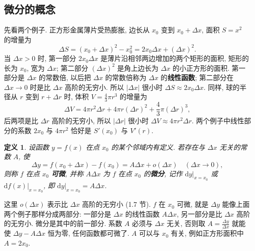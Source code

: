 \documentclass[UTF8,openany]{ctexbook}
\theoremstyle{chinesetextbook}
\newtheorem*{definitionsingle}{定义}
\newcommand{\dd}{\mathrm d}
\begin{document}
\subsection{微分的概念}
先看两个例子. 正方形金属薄片受热膨胀, 边长从 $x_0$ 变到 $x_0+\Delta x$, 面积 $S=x^2$ 的增量为
\[
\Delta S=(x_0+\Delta x)^2-x_0^2=2x_0\Delta x+(\Delta x)^2.
\]
当 $\Delta x>0$ 时, 第一部分 $2x_0\Delta x$ 是薄片沿相邻两边增加的两个矩形的面积, 矩形的长为 $x_0$, 宽为 $\Delta x$; 第二部分 $(\Delta x)^2$ 是角上边长为 $\Delta x$ 的小正方形的面积. 第一部分是 $\Delta x$ 的常数倍, 以后把 $\Delta x$ 的常数倍称为 $\Delta x$ 的\textbf{线性函数}; 第二部分在 $\Delta x\to0$ 时是比 $\Delta x$ 高阶的无穷小. 所以 $|\Delta x|$ 很小时 $\Delta S\approx2x_0\Delta x$. 同样, 球的半径从 $r$ 变到 $r+\Delta r$ 时, 体积 $\displaystyle V=\frac43\pi r^3$ 的增量为
\[
\Delta V=4\pi r^2\Delta r+4\pi r(\Delta r)^2+\frac43\pi(\Delta r)^3,
\]
后两项是比 $\Delta r$ 高阶的无穷小, 所以 $|\Delta r|$ 很小时 $\Delta V\approx4\pi r^2\Delta r$. 两个例子中线性部分的系数 $2x_0$ 与 $4\pi r^2$ 恰好是 $S'(x_0)$ 与 $V'(r)$.
\begin{definitionsingle}
设函数 $y=f(x)$ 在点 $x_0$ 的某个邻域内有定义. 若存在与 $\Delta x$ 无关的常数 $A$, 使
\[
\Delta y=f(x_0+\Delta x)-f(x_0)=A\Delta x+o(\Delta x)\quad(\Delta x\to0),
\]
则称 $f$ 在点 $x_0$ \textbf{可微}, 并称 $A\Delta x$ 为 $f$ 在点 $x_0$ 的\textbf{微分}, 记作 $\dd y\big|_{x=x_0}$ 或 $\dd f(x)\big|_{x=x_0}$, 即 $\dd y\big|_{x=x_0}=A\Delta x$.
\end{definitionsingle}
这里 $o(\Delta x)$ 表示比 $\Delta x$ 高阶的无穷小 (1.7 节). $f$ 在 $x_0$ 可微, 就是 $\Delta y$ 能像上面两个例子那样分成两部分: 一部分是 $\Delta x$ 的线性函数 $A\Delta x$, 另一部分是比 $\Delta x$ 高阶的无穷小. 微分是其中的前一部分. 系数 $A$ 必须与 $\Delta x$ 无关, 否则取 $\displaystyle A=\frac{\Delta y}{\Delta x}$ 就能使 $\Delta y-A\Delta x$ 恒为零, 任何函数都可微了. $A$ 可以与 $x_0$ 有关, 例如正方形面积中 $A=2x_0$.
\end{document}
